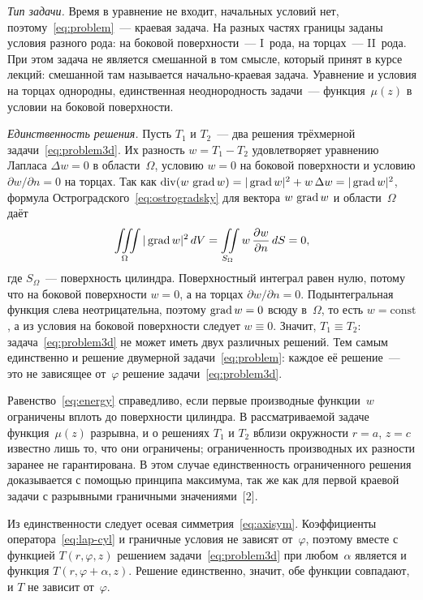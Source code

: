 \emph{Тип задачи.} Время в уравнение не входит, начальных условий нет,
поэтому~\eqref{eq:problem}~— краевая задача. На разных частях границы
заданы условия разного рода: на боковой поверхности~— I~рода, на торцах~—
II~рода. При этом задача не является смешанной в том смысле, который принят
в курсе лекций: смешанной там называется начально-краевая задача. Уравнение
и условия на торцах однородны, единственная неоднородность задачи~—
функция~$\mu(z)$ в условии на боковой поверхности.

\emph{Единственность решения.} Пусть $T_1$ и $T_2$~— два решения
трёхмерной задачи~\eqref{eq:problem3d}. Их разность $w=T_1-T_2$
удовлетворяет уравнению Лапласа $\Delta w=0$ в области~$\Omega$, условию
${w=0}$ на боковой поверхности и условию ${\partial w/\partial n=0}$ на
торцах. Так как
$\operatorname{div}(w\,\operatorname{grad} w)=|\operatorname{grad} w|^2+w\,\Delta w=|\operatorname{grad} w|^2$, формула
Остроградского~\eqref{eq:ostrogradsky} для вектора $w\,\operatorname{grad} w$ и
области~$\Omega$ даёт
\begin{equation}
\label{eq:energy}
\iiint\limits_{\Omega}|\operatorname{grad} w|^{2}\,dV
=\iint\limits_{S_\Omega} w\,\dfrac{\partial w}{\partial n}\,dS=0,
\end{equation}
где $S_\Omega$~— поверхность цилиндра. Поверхностный интеграл равен нулю,
потому что на боковой поверхности ${w=0}$, а на торцах
${\partial w/\partial n=0}$. Подынтегральная функция слева неотрицательна,
поэтому $\operatorname{grad} w=0$ всюду в~$\Omega$, то есть $w=\mathrm{const}$, а из
условия на боковой поверхности следует ${w\equiv 0}$. Значит,
$T_1\equiv T_2$: задача~\eqref{eq:problem3d} не может иметь двух различных
решений. Тем самым единственно и решение двумерной
задачи~\eqref{eq:problem}: каждое её решение~— это не зависящее
от~$\varphi$ решение задачи~\eqref{eq:problem3d}.

Равенство~\eqref{eq:energy} справедливо, если первые производные
функции~$w$ ограничены вплоть до поверхности цилиндра. В рассматриваемой
задаче функция~$\mu(z)$ разрывна, и о решениях $T_1$ и $T_2$ вблизи
окружности $r=a$, $z=c$ известно лишь то, что они ограничены;
ограниченность производных их разности заранее не гарантирована. В этом
случае единственность ограниченного решения доказывается с помощью принципа
максимума, так же как для первой краевой задачи с разрывными граничными
значениями~[2].

Из единственности следует осевая симметрия~\eqref{eq:axisym}. Коэффициенты
оператора~\eqref{eq:lap-cyl} и граничные условия не зависят от~$\varphi$,
поэтому вместе с функцией $T(r,\varphi,z)$ решением
задачи~\eqref{eq:problem3d} при любом~$\alpha$ является и функция
$T(r,\varphi+\alpha,z)$. Решение единственно, значит, обе функции
совпадают, и $T$ не зависит от~$\varphi$.

